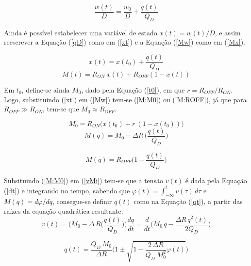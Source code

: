\documentclass{ceel}
\begin{document}
\begin{multicols}{2}
\begin{equation}\label{qD}
\dfrac{w(t)}{D}=\dfrac{w_0}{D}+\dfrac{q(t)}{Q_D}
\end{equation}
\vspace{0.04cm}

Ainda é possível estabelecer uma variável de estado $x(t)=w(t)/D$, e assim reescrever a Equação (\ref{qD}) como em (\ref{xt}) e a Equação (\ref{Mw}) como em (\ref{Mx}).

\begin{equation}\label{xt}
x(t)=x(t_0)+\dfrac{q(t)}{Q_D}
\end{equation}
\begin{equation}\label{Mx}
M(t)=R_{ON}\ x(t)+ R_{OFF}(1-x(t))
\end{equation}
\vspace{0.001cm}

Em $t_0$, define-se ainda $M_0$, dado pela Equação (\ref{t0}), em que $r=R_{OFF}/R_{ON}$. Logo, substituindo (\ref{xt}) em (\ref{Mw}) tem-se (\ref{M:M0}) ou (\ref{M:ROFF}), já que para $R_{OFF}\gg R_{ON}$, tem-se que $M_0\approx R_{OFF}$.
\vspace{0.05cm}

\begin{equation}\label{t0}
M_0  =R_{ON}\big( x(t_0)+ r\ (1-x(t_0))\big)
\end{equation}
\begin{equation}\label{M:M0}%
M(q)=M_0-\Delta R\, \bigg(\dfrac{q(t)}{Q_D}\bigg)
\end{equation}

\begin{equation}\label{M:ROFF}%
M(q)=R_{OFF}\bigg( 1-\dfrac{q(t)}{Q_D}\bigg)
\end{equation}
\vspace{0.04cm}

Subsituindo (\ref{M:M0}) em (\ref{vMi}) tem-se que a tensão $v(t)$ é dada pela Equação (\ref{dt}) e integrando no tempo, sabendo que $\varphi(t)=\int_{-\infty}^t v(\tau)\, d\tau$ e $M(q)=d\varphi/dq$,  consegue-se definir $q(t)$ como na Equação (\ref{qt}), a partir das raízes da equação quadrática resultante.
%
\begin{equation}\label{dt}
v(t)=\Big(M_0-\Delta \, R\Big(\dfrac{q(t)}{Q_D}\Big)\Big)\dfrac{dq}{dt} = \dfrac{d}{dt} \Big(M_0\, q-\dfrac{\Delta R\, q^2(t)}{2 Q_D}\Big)
\end{equation}

\begin{equation}\label{qt}
q(t)=\dfrac{Q_D\ M_0}{\Delta R}\Bigg(1\pm\sqrt{1-\dfrac{2\, \Delta R}{Q_D\ M^2_0}\varphi(t)}\Bigg)
\end{equation} 
\vspace{0.04cm}


\end{multicols}
\end{document}
